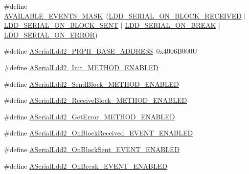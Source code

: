 \begin{DoxyCompactItemize}
\item 
\#define \hyperlink{group___a_serial_ldd2__module_ga5f04a8830cd52a3ffa1678d113f31aee}{A\+V\+A\+I\+L\+A\+B\+L\+E\+\_\+\+E\+V\+E\+N\+T\+S\+\_\+\+M\+A\+SK}~(\hyperlink{group___p_e___types__module_ga1bdfbf78e53d634c2d6c0fac21346a9d}{L\+D\+D\+\_\+\+S\+E\+R\+I\+A\+L\+\_\+\+O\+N\+\_\+\+B\+L\+O\+C\+K\+\_\+\+R\+E\+C\+E\+I\+V\+ED} $\vert$ \hyperlink{group___p_e___types__module_gab32dd0cda62049bd256c1b13d6848ebd}{L\+D\+D\+\_\+\+S\+E\+R\+I\+A\+L\+\_\+\+O\+N\+\_\+\+B\+L\+O\+C\+K\+\_\+\+S\+E\+NT} $\vert$ \hyperlink{group___p_e___types__module_ga5791992a91907e5233a850cd45ea8c21}{L\+D\+D\+\_\+\+S\+E\+R\+I\+A\+L\+\_\+\+O\+N\+\_\+\+B\+R\+E\+AK} $\vert$ \hyperlink{group___p_e___types__module_ga22530c977497afda0f11c86bbf869550}{L\+D\+D\+\_\+\+S\+E\+R\+I\+A\+L\+\_\+\+O\+N\+\_\+\+E\+R\+R\+OR})
\item 
\#define \hyperlink{group___a_serial_ldd2__module_ga0b40933a9f68fae4f6112ed9a6cfd9ef}{A\+Serial\+Ldd2\+\_\+\+P\+R\+P\+H\+\_\+\+B\+A\+S\+E\+\_\+\+A\+D\+D\+R\+E\+SS}~0x4006\+B000U
\item 
\#define \hyperlink{group___a_serial_ldd2__module_ga0733c5676cb9059befd74a42eec355a1}{A\+Serial\+Ldd2\+\_\+\+Init\+\_\+\+M\+E\+T\+H\+O\+D\+\_\+\+E\+N\+A\+B\+L\+ED}
\item 
\#define \hyperlink{group___a_serial_ldd2__module_ga473316fdf4995cf5d1ecac85c658e5ed}{A\+Serial\+Ldd2\+\_\+\+Send\+Block\+\_\+\+M\+E\+T\+H\+O\+D\+\_\+\+E\+N\+A\+B\+L\+ED}
\item 
\#define \hyperlink{group___a_serial_ldd2__module_gada8358a92a4e4793f21bbc76e95ca7cf}{A\+Serial\+Ldd2\+\_\+\+Receive\+Block\+\_\+\+M\+E\+T\+H\+O\+D\+\_\+\+E\+N\+A\+B\+L\+ED}
\item 
\#define \hyperlink{group___a_serial_ldd2__module_gad0d7256dc7800d335b9bb2122ae19459}{A\+Serial\+Ldd2\+\_\+\+Get\+Error\+\_\+\+M\+E\+T\+H\+O\+D\+\_\+\+E\+N\+A\+B\+L\+ED}
\item 
\#define \hyperlink{group___a_serial_ldd2__module_ga1de13d2017cc0ef844acf2c461975589}{A\+Serial\+Ldd2\+\_\+\+On\+Block\+Received\+\_\+\+E\+V\+E\+N\+T\+\_\+\+E\+N\+A\+B\+L\+ED}
\item 
\#define \hyperlink{group___a_serial_ldd2__module_ga7dfcea605c62f020478dd3d4cbf9beb1}{A\+Serial\+Ldd2\+\_\+\+On\+Block\+Sent\+\_\+\+E\+V\+E\+N\+T\+\_\+\+E\+N\+A\+B\+L\+ED}
\item 
\#define \hyperlink{group___a_serial_ldd2__module_ga975445b42dc0a4fc37d8683c75c73287}{A\+Serial\+Ldd2\+\_\+\+On\+Break\+\_\+\+E\+V\+E\+N\+T\+\_\+\+E\+N\+A\+B\+L\+ED}

\end{DoxyCompactItemize}
